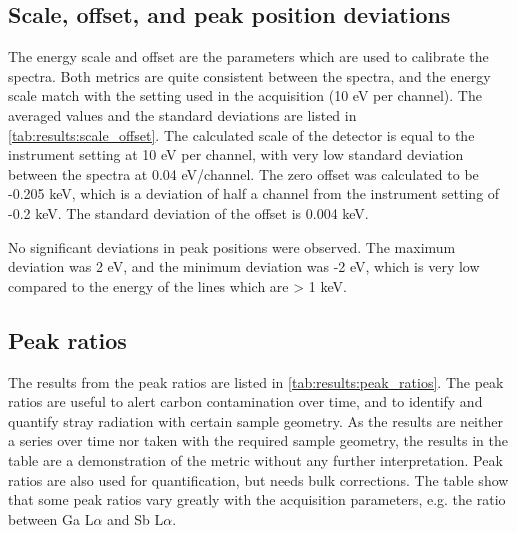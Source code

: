 


\subsection{Scale, offset, and peak position deviations}
\label{results:scaleoffset}

The energy scale and offset are the parameters which are used to calibrate the spectra.
Both metrics are quite consistent between the spectra, and the energy scale match with the setting used in the acquisition (10 eV per channel).
The averaged values and the standard deviations are listed in \cref{tab:results:scale_offset}.
The calculated scale of the detector is equal to the instrument setting at 10 eV per channel, with very low standard deviation between the spectra at 0.04 eV/channel.
The zero offset was calculated to be -0.205 keV, which is a deviation of half a channel from the instrument setting of -0.2 keV.
The standard deviation of the offset is 0.004 keV.




No significant deviations in peak positions were observed.
The maximum deviation was 2 eV, and the minimum deviation was -2 eV, which is very low compared to the energy of the lines which are > 1 keV.







\subsection{Peak ratios}
\label{results:peak_ratios}

The results from the peak ratios are listed in \cref{tab:results:peak_ratios}.
The peak ratios are useful to alert carbon contamination over time, and to identify and quantify stray radiation with certain sample geometry.
As the results are neither a series over time nor taken with the required sample geometry, the results in the table are a demonstration of the metric without any further interpretation.
Peak ratios are also used for quantification, but needs bulk corrections.
The table show that some peak ratios vary greatly with the acquisition parameters, e.g. the ratio between Ga L$\alpha$ and Sb L$\alpha$.



